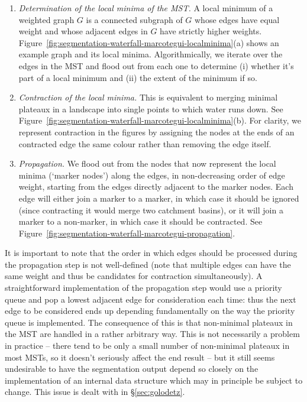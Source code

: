 \documentclass[review,a4paper]{elsarticle}
\begin{document}
\begin{enumerate}

\item \emph{Determination of the local minima of the MST.} A local minimum of a weighted graph $G$ is a connected subgraph of $G$ whose edges have equal weight and whose adjacent edges in $G$ have strictly higher weights. Figure~\ref{fig:segmentation-waterfall-marcotegui-localminima}(a) shows an example graph and its local minima. Algorithmically, we iterate over the edges in the MST and flood out from each one to determine (i) whether it's part of a local minimum and (ii) the extent of the minimum if so.

\item \emph{Contraction of the local minima.} This is equivalent to merging minimal plateaux in a landscape into single points to which water runs down. See Figure~\ref{fig:segmentation-waterfall-marcotegui-localminima}(b). For clarity, we represent contraction in the figures by assigning the nodes at the ends of an contracted edge the same colour rather than removing the edge itself.

\item \emph{Propagation.} We flood out from the nodes that now represent the local minima (`marker nodes') along the edges, in non-decreasing order of edge weight, starting from the edges directly adjacent to the marker nodes. Each edge will either join a marker to a marker, in which case it should be ignored (since contracting it would merge two catchment basins), or it will join a marker to a non-marker, in which case it should be contracted. See Figure~\ref{fig:segmentation-waterfall-marcotegui-propagation}.

\end{enumerate}

\noindent It is important to note that the order in which edges should be processed during the propagation step is not well-defined (note that multiple edges can have the same weight and thus be candidates for contraction simultaneously). A straightforward implementation of the propagation step would use a priority queue and pop a lowest adjacent edge for consideration each time: thus the next edge to be considered ends up depending fundamentally on the way the priority queue is implemented. The consequence of this is that non-minimal plateaux in the MST are handled in a rather arbitrary way. This is not necessarily a problem in practice -- there tend to be only a small number of non-minimal plateaux in most MSTs, so it doesn't seriously affect the end result -- but it still seems undesirable to have the segmentation output depend so closely on the implementation of an internal data structure which may in principle be subject to change. This issue is dealt with in \S\ref{sec:golodetz}.
\end{document}
